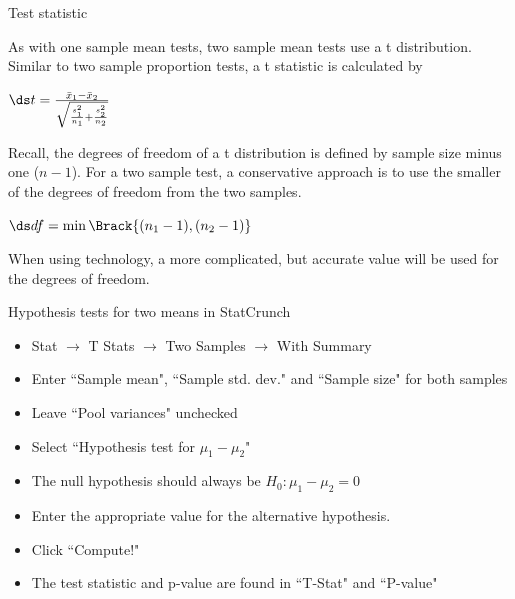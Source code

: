 \documentclass[xcolor=table]{beamer}
\begin{document}
\begin{frame}{Test statistic}
\begin{block}{}
\large
As with one sample mean tests, two sample mean tests use a t distribution. Similar to two sample proportion tests, a t statistic  is calculated by\\
\medskip
{\centering $\ds t = \frac {\bar x_1 - \bar x_2}{\sqrt{\frac{s_1^2}{n_1} + \frac{s_2^2}{n_2}}}$ \par}
\medskip\pause
Recall, the degrees of freedom of a t distribution is defined by sample size minus one ($n-1$). For a two sample test, a conservative approach is to use the smaller of the degrees of freedom from the two samples.\\
\medskip
{\centering $\ds df = \min\Brack{(n_1-1) , (n_2-1)}$ \par}
\pause\medskip
When using technology, a more complicated, but accurate value will be used for the degrees of freedom.
\end{block}
\end{frame}

\begin{frame}{Hypothesis tests for two means in StatCrunch}

\begin{block}{}
\large
\begin{itemize}
\item Stat $\to$ T Stats $\to$ Two Samples $\to$ With Summary
\item Enter ``Sample mean", ``Sample std. dev." and ``Sample size" for both samples
\item Leave ``Pool variances" unchecked
\item Select ``Hypothesis test for $\mu_1 - \mu_2$"
\item The null hypothesis should always be $H_0: \mu_1 - \mu_2 = 0$
\item Enter the appropriate value for the alternative hypothesis.
\item Click ``Compute!"
\item The test statistic and p-value are found in ``T-Stat" and ``P-value"
\end{itemize}
\end{block}

\end{frame}
\end{document}
